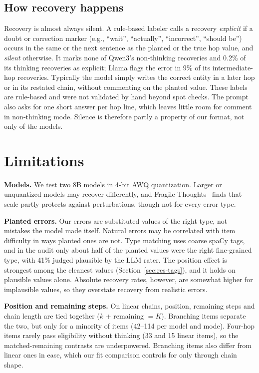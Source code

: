 \documentclass[conference]{IEEEtran}
\begin{document}
\subsection{How recovery happens}
Recovery is almost always silent. A rule-based labeler calls a recovery \emph{explicit} if a doubt or correction marker (e.g., ``wait'', ``actually'', ``incorrect'', ``should be'') occurs in the same or the next sentence as the planted or the true hop value, and \emph{silent} otherwise. It marks none of Qwen3's non-thinking recoveries and 0.2\% of its thinking recoveries as explicit; Llama flags the error in 9\% of its intermediate-hop recoveries. Typically the model simply writes the correct entity in a later hop or in its restated chain, without commenting on the planted value. These labels are rule-based and were not validated by hand beyond spot checks. The prompt also asks for one short answer per hop line, which leaves little room for comment in non-thinking mode. Silence is therefore partly a property of our format, not only of the models.

\section{Limitations}
\textbf{Models.} We test two 8B models in 4-bit AWQ quantization. Larger or unquantized models may recover differently, and Fragile Thoughts~\cite{fragile} finds that scale partly protects against perturbations, though not for every error type.

\textbf{Planted errors.} Our errors are substituted values of the right type, not mistakes the model made itself. Natural errors may be correlated with item difficulty in ways planted ones are not. Type matching uses coarse spaCy tags, and in the audit only about half of the planted values were the right fine-grained type, with 41\% judged plausible by the LLM rater. The position effect is strongest among the cleanest values (Section~\ref{sec:res-tags}), and it holds on plausible values alone. Absolute recovery rates, however, are somewhat higher for implausible values, so they overstate recovery from realistic errors.

\textbf{Position and remaining steps.} On linear chains, position, remaining steps and chain length are tied together ($k$ + remaining $= K$). Branching items separate the two, but only for a minority of items (42--114 per model and mode). Four-hop items rarely pass eligibility without thinking (33 and 15 linear items), so the matched-remaining contrasts are underpowered. Branching items also differ from linear ones in ease, which our fit comparison controls for only through chain shape.
\end{document}

